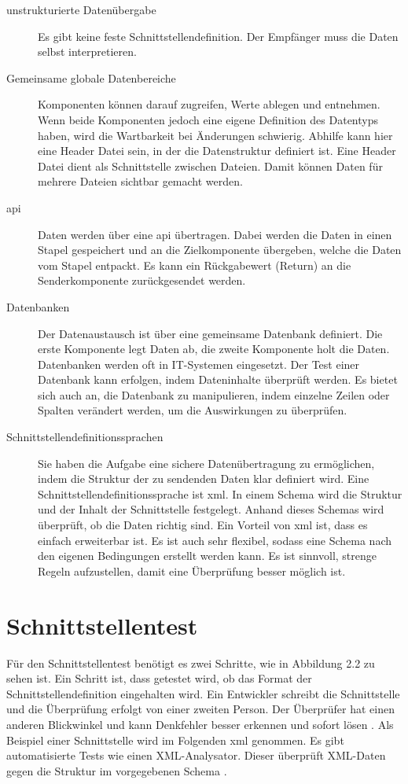 \begin{description}
\item[unstrukturierte Datenübergabe] Es gibt keine feste Schnittstellendefinition. 
Der Empfänger muss die Daten selbst interpretieren. %
\item[Gemeinsame globale Datenbereiche] Komponenten können darauf zugreifen, Werte ablegen und entnehmen.
Wenn beide Komponenten jedoch eine eigene Definition des Datentyps haben, wird die Wartbarkeit bei Änderungen
schwierig. Abhilfe kann hier eine Header Datei sein, in der die Datenstruktur definiert ist. Eine Header Datei
dient als Schnittstelle zwischen Dateien. Damit können Daten für mehrere Dateien sichtbar gemacht werden.
\item[\ac{api}] Daten werden über eine \ac{api} übertragen. Dabei werden die Daten 
in einen Stapel gespeichert und an die Zielkomponente übergeben, welche die Daten vom Stapel entpackt. Es kann
ein Rückgabewert (Return) an die Senderkomponente zurückgesendet werden.
\item[Datenbanken] Der Datenaustausch ist über eine gemeinsame Datenbank definiert. Die erste Komponente legt
Daten ab, die zweite Komponente holt die Daten. Datenbanken
werden oft in IT-Systemen eingesetzt.
Der Test einer Datenbank kann erfolgen, indem Dateninhalte überprüft werden. Es bietet sich auch an, die Datenbank
zu manipulieren, indem einzelne Zeilen oder Spalten verändert werden, um die Auswirkungen zu überprüfen.
\item[Schnittstellendefinitionssprachen] Sie haben die Aufgabe eine sichere Datenübertragung
zu ermöglichen, indem die Struktur der zu sendenden Daten klar definiert wird.
Eine Schnittstellendefinitionssprache ist \ac{xml}. In einem Schema wird die 
Struktur und der Inhalt der Schnittstelle festgelegt. Anhand dieses Schemas wird überprüft, ob die Daten richtig sind.
Ein Vorteil von \ac{xml} ist, dass es einfach erweiterbar ist. Es ist auch sehr flexibel, sodass eine Schema nach
den eigenen Bedingungen erstellt werden kann. Es ist sinnvoll, strenge Regeln aufzustellen, damit eine Überprüfung besser
möglich ist.
\end{description}


\section*{Schnittstellentest}
Für den Schnittstellentest benötigt es zwei Schritte, wie in Abbildung 2.2 zu sehen ist.
Ein Schritt ist, dass getestet wird, ob das Format der Schnittstellendefinition eingehalten wird.
Ein Entwickler schreibt die Schnittstelle und die Überprüfung erfolgt von einer zweiten Person. Der Überprüfer hat einen
anderen Blickwinkel und kann Denkfehler besser erkennen und sofort lösen \parencite[S. 226]{integration}.
Als Beispiel einer Schnittstelle wird im Folgenden \ac{xml} genommen.
Es gibt automatisierte Tests wie einen XML-Analysator. Dieser überprüft XML-Daten gegen die Struktur im vorgegebenen
Schema \parencite[S. 237]{integration}.

